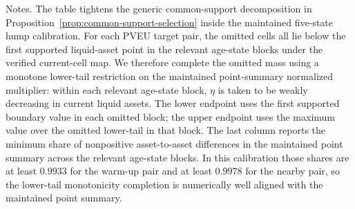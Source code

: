 \begin{table}[t]
\centering
\caption{Model-implied omitted-support bounds from monotone lower-tail completion}
\label{tab:omitted-support-bounds}
\footnotesize
\renewcommand{\arraystretch}{1.08}
\begin{minipage}{0.98\textwidth}
\footnotesize Notes. The table tightens the generic common-support decomposition in Proposition~\ref{prop:common-support-selection} inside the maintained five-state hump calibration. For each PVEU target pair, the omitted cells all lie below the first supported liquid-asset point in the relevant age-state blocks under the verified current-cell map. We therefore complete the omitted mass using a monotone lower-tail restriction on the maintained point-summary normalized multiplier: within each relevant age-state block, $\eta$ is taken to be weakly decreasing in current liquid assets. The lower endpoint uses the first supported boundary value in each omitted block; the upper endpoint uses the maximum value over the omitted lower-tail in that block. The last column reports the minimum share of nonpositive asset-to-asset differences in the maintained point summary across the relevant age-state blocks. In this calibration those shares are at least $0.9933$ for the warm-up pair and at least $0.9978$ for the nearby pair, so the lower-tail monotonicity completion is numerically well aligned with the maintained point summary.
\end{minipage}
\end{table}
